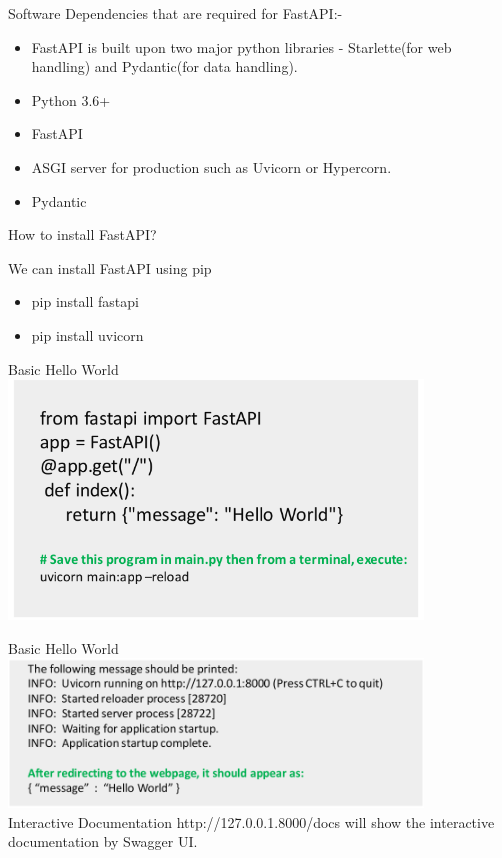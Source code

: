\documentclass[aspectratio=169,12pt,usenames,dvipsnames]{beamer}
\begin{document}
\begin{frame}[t]{Software Dependencies that are required for FastAPI:-}
\begin{itemize}
\item FastAPI is built upon two major python libraries - Starlette(for web handling) and Pydantic(for data handling).\\
\item Python 3.6+
\item FastAPI
\item ASGI server for production such as Uvicorn or Hypercorn.
\item Pydantic
\end{itemize}
\end{frame}


\begin{frame}[t]{How to install FastAPI?}
\begin{block}{We can install FastAPI using pip}
\begin{itemize}
\item pip install fastapi
\item pip install uvicorn
\end{itemize}
\end{block}
\end{frame}


\begin{frame}[t]{Basic Hello World}
\centering
\includegraphics[width=11cm]{FastAPI_Images/AIML_FastAPI_IMG1.png}
\end{frame}


\begin{frame}[t]{Basic Hello World}
\includegraphics[width=11cm]{FastAPI_Images/AIML_FastAPI_IMG2.png}\\
\small Interactive Documentation {http://127.0.0.1.8000/docs} will show the interactive documentation by Swagger UI.
\end{frame}
\end{document}
